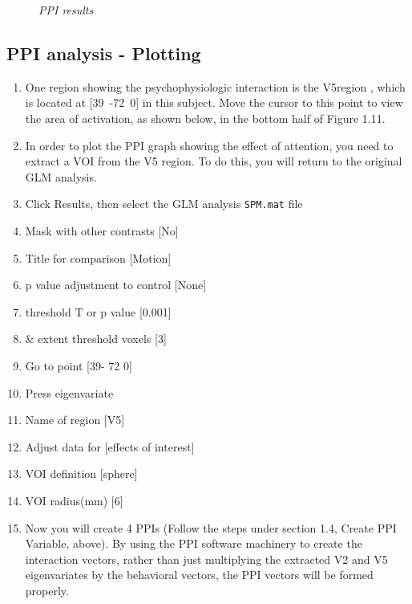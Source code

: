 \begin{figure}[!ht]
\centering{}
\caption{\em PPI results}
\label{ppi_fig11}
\end{figure}

\subsection{PPI analysis - Plotting}

\begin{enumerate}
\item One region showing the psychophysiologic interaction is the V5region , which is located at [39~-72~0] in this subject. Move the cursor to this point to view the area of activation, as shown below, in the bottom half of Figure 1.11.

\item In order to plot the PPI graph showing the effect of attention, you need to extract a VOI from the V5 region. To do this, you will return to the original GLM analysis.
\item Click Results, then select the GLM analysis \texttt{SPM.mat} file
\item Mask with other contrasts [No]
\item Title for comparison [Motion]
\item p value adjustment to control [None]
\item threshold {T or p value} [0.001]
\item \& extent threshold {voxels} [3]
\item Go to point [39- 72 0]
\item Press eigenvariate
\item Name of region [V5]
\item Adjust data for [effects of interest]
\item VOI definition [sphere]
\item VOI radius(mm) [6]
\item Now you will create 4 PPIs (Follow the steps under section 1.4, Create PPI Variable, above). By using the PPI software machinery to create the interaction vectors, rather than just multiplying the extracted V2 and V5 eigenvariates by the behavioral vectors, the PPI vectors will be formed properly.


\end{enumerate}
